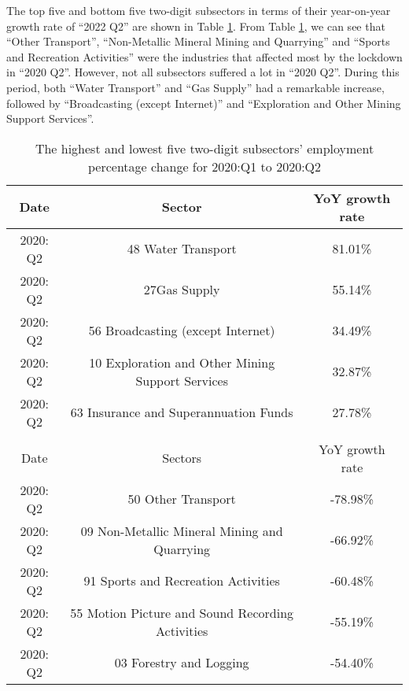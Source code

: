 \documentclass{monashthesis}
\begin{document}
The top five and bottom five two-digit subsectors in terms of their year-on-year growth rate of ``2022 Q2'' are shown in Table \ref{tab:comp}. From Table \ref{tab:comp}, we can see that ``Other Transport'', ``Non-Metallic Mineral Mining and Quarrying'' and ``Sports and Recreation Activities'' were the industries that affected most by the lockdown in ``2020 Q2''. However, not all subsectors suffered a lot in ``2020 Q2''. During this period, both ``Water Transport'' and ``Gas Supply'' had a remarkable increase, followed by ``Broadcasting (except Internet)'' and ``Exploration and Other Mining Support Services''.

\begin{table}[ht]
\begin{center}
\begin{tabular}{ccc}
\hline
Date     & Sector                                        & YoY growth rate \\
\hline
2020: Q2  & 48 Water Transport                            & 81.01\%                                \\
2020: Q2 & 27Gas Supply      & 55.14\%                                \\

2020: Q2 & 56 Broadcasting (except Internet)                            & 34.49\%                                \\
2020: Q2 & 10 Exploration and Other Mining Support Services                     & 32.87\%                                \\
2020: Q2 & 63 Insurance and Superannuation Funds & 27.78\% 
                 \\
                 \\
                 \hline
Date     &  Sectors                                      &YoY growth rate \\
                 \hline
2020: Q2 & 50 Other Transport                 &-78.98\%  
                 \\
2020: Q2 & 09 Non-Metallic Mineral Mining and Quarrying    & -66.92\% 
                 \\
2020: Q2 & 91 Sports and Recreation Activities & -60.48\% 
                 \\
2020: Q2 & 55 Motion Picture and Sound Recording Activities                           & -55.19\%  
                 \\
2020: Q2 & 03 Forestry and Logging         & -54.40\%
\end{tabular}
\end{center}
\caption{The highest and lowest five two-digit subsectors' employment percentage change for 2020:Q1 to 2020:Q2 }
\label{tab:comp}
\end{table}
\end{document}
